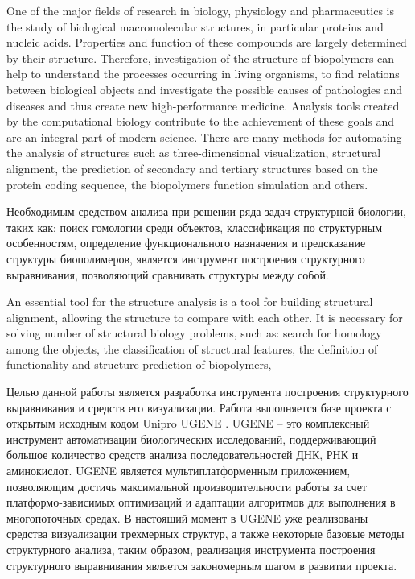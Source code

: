 \documentclass[a4paper, 12pt, titlepage, utf8]{extarticle}
\begin{document}
One of the major fields of research in biology, physiology and pharmaceutics is
the study of biological macromolecular structures, in particular proteins and
nucleic acids. Properties and function of these compounds are largely determined
by their structure. Therefore, investigation of the structure of biopolymers can
help to understand the processes occurring in living organisms, to find
relations between biological objects and investigate the possible causes of
pathologies and diseases and thus create new high-performance medicine. Analysis
tools created by the computational biology contribute to the achievement of
these goals and are an integral part of modern science. There are many methods
for automating the analysis of structures such as three-dimensional
visualization, structural alignment, the prediction of secondary and tertiary
structures based on the protein coding sequence, the biopolymers function
simulation and others.

\begin{original}
Необходимым средством анализа при решении ряда задач структурной биологии, таких
как: поиск гомологии среди объектов, классификация по структурным особенностям,
определение функционального назначения и предсказание структуры биополимеров,
является инструмент построения структурного выравнивания, позволяющий сравнивать
структуры между собой.
\end{original}

An essential tool for the structure analysis is a tool for building structural
alignment, allowing the structure to compare with each other. It is necessary
for solving number of structural biology problems, such as: search for homology
among the objects, the classification of structural features, the definition of
functionality and structure prediction of biopolymers,

\begin{original}
Целью данной работы является разработка инструмента построения структурного
выравнивания и средств его визуализации. Работа выполняется базе проекта с
открытым исходным кодом Unipro UGENE \cite{ugene}. UGENE -- это комплексный
инструмент автоматизации биологических исследований, поддерживающий большое
количество средств анализа последовательностей ДНК, РНК и аминокислот. UGENE
является мультиплатформенным приложением, позволяющим достичь максимальной
производительности работы за счет платформо-зависимых оптимизаций и адаптации
алгоритмов для выполнения в многопоточных средах. В настоящий момент в UGENE уже
реализованы средства визуализации трехмерных структур, а также некоторые базовые
методы структурного анализа, таким образом, реализация инструмента построения
структурного выравнивания является закономерным шагом в развитии проекта.
\end{original}
\end{document}
